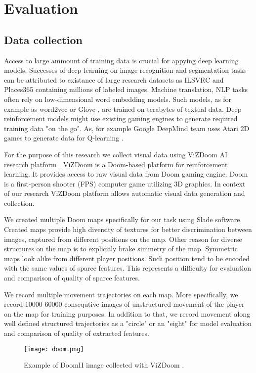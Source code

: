 
\chapter{Evaluation}
\label{cha:eval}

\section{Data collection}
Access to large ammount of training data is crucial for appying deep learning models.
Successes of deep learning on image recognition and segmentation tasks can be attributed to existance of large research datasets as ILSVRC and Places365 \cite{ILSVRC15, Zhou2016} containing millions of labeled images.
Machine translation, NLP tasks \cite{Karpathy2014, Kim2014} often rely on low-dimensional word embedding models.
Such models, as for example as word2vec or Glove \cite{Mikolov2013, pennington2014glove}, are trained on terabytes of textual data.
Deep reinforcement models might use existing gaming engines to generate required training data "on the go".
As, for example Google DeepMind team uses Atari 2D games to generate data for Q-learning \cite{Mnih2013}.

For the purpose of this research we collect visual data using ViZDoom AI research platform \cite{Kempka2016}.
ViZDoom is a Doom-based platform for reinforcement learning.
It provides access to raw visual data from Doom gaming engine.
Doom is a first-person shooter (FPS) computer game utilizing 3D graphics.
In context of our research ViZDoom platform allows automatic visual data generation and collection.

We created multiple Doom maps specifically for our task using Slade \cite{Slade3} software.
Created maps provide high diversity of textures for better discrimination between images, captured from different positions on the map.
Other reason for diverse structures on the map is to explicitly brake simmetry of the map.
Symmetric maps look alike from different player positions.
Such position tend to be encoded with the same values of sparce features.
This represents a difficulty for evaluation and comparison of quality of sparce features.

We record multiple movement trajectories on each map.
More specifically, we record 10000-60000 consequtive images of unstructured movement of the player on the map for training purposes.
In addition to that, we record movement along well defined structured trajectories as a "circle" or an "eight" for model evaluation and comparison of quality of extracted features.


\begin{figure}
\centering
\texttt{[image: doom.png]} %
\caption{Example of DoomII image collected with ViZDoom \cite{Kempka2016}.}
\label{fig:doom}
\end{figure}
